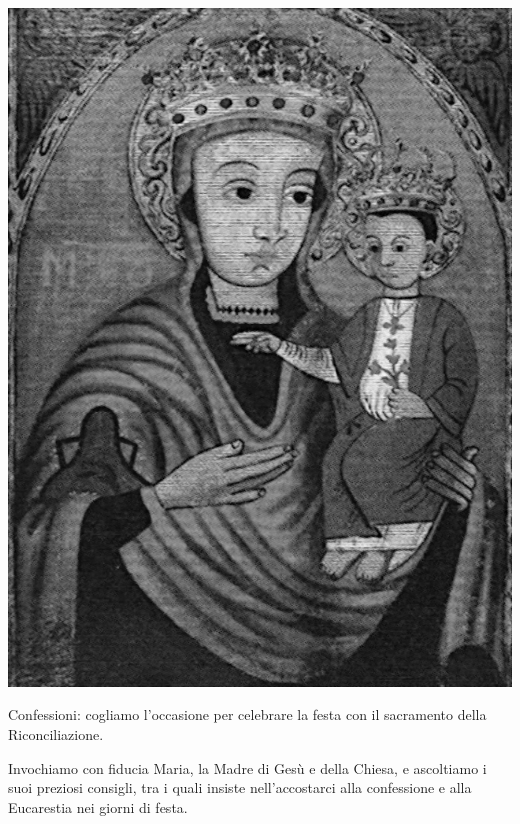 \begin{center}
\vspace{1em}

\begin{minipage}{0.25\textwidth}
\includegraphics[width=\textwidth]{angolo.png}
\end{minipage}
\hfill
\begin{minipage}{0.72\textwidth}
Confessioni: cogliamo l’occasione per celebrare la festa con il sacramento della Riconciliazione.

Invochiamo con fiducia Maria, la Madre di Gesù e della Chiesa, e ascoltiamo i suoi preziosi consigli, tra i quali insiste nell’accostarci alla confessione e alla Eucarestia nei giorni di festa.
\end{minipage}

\end{center}


\normalsize
